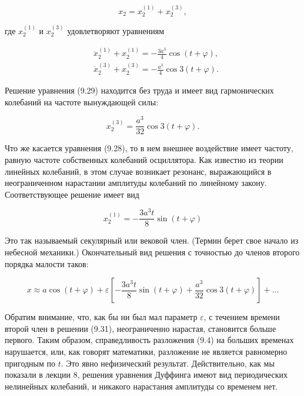 \documentclass[10pt]{article}
\begin{document}
\begin{equation*}
x_{2}=x_{2}^{(1)}+x_{2}^{(3)}, \tag{9.27}
\end{equation*}


где $x_{2}^{(1)}$ и $x_{2}^{(3)}$ удовлетворяют уравнениям


\begin{align*}
& \ddot{x}_{2}^{(1)}+x_{2}^{(1)}=-\frac{3 a^{3}}{4} \cos (t+\varphi),  \tag{9.28}\\
& \ddot{x}_{2}^{(3)}+x_{2}^{(3)}=-\frac{a^{3}}{4} \cos 3(t+\varphi) . \tag{9.29}
\end{align*}


Решение уравнения (9.29) находится без труда и имеет вид гармонических колебаний на частоте вынуждающей силы:


\begin{equation*}
x_{2}^{(3)}=\frac{a^{3}}{32} \cos 3(t+\varphi) . \tag{9.30}
\end{equation*}


Что же касается уравнения (9.28), то в нем внешнее воздействие имеет частоту, равную частоте собственных колебаний осциллятора. Как известно из теории линейных колебаний, в этом случае возникает резонанс, выражающийся в неограниченном нарастании амплитуды колебаний по линейному закону. Соответствующее решение имеет вид


\begin{equation*}
x_{2}^{(1)}=-\frac{3 a^{3} t}{8} \sin (t+\varphi) \tag{9.30}
\end{equation*}


Это так называемый секулярный или вековой член. (Термин берет свое начало из небесной механики.) Окончательный вид решения с точностью до членов второго порядка малости таков:


\begin{equation*}
x \approx a \cos (t+\varphi)+\varepsilon\left[-\frac{3 a^{3} t}{8} \sin (t+\varphi)+\frac{a^{3}}{32} \cos 3(t+\varphi)\right]+\ldots \tag{9.31}
\end{equation*}


Обратим внимание, что, как бы ни был мал параметр $\varepsilon$, с течением времени второй член в решении (9.31), неограниченно нарастая, становится больше первого. Таким образом, справедливость разложения (9.4) на больших временах нарушается, или, как говорят математики, разложение не является равномерно пригодным по $t$. Это явно нефизический результат. Действительно, как мы показали в лекции 8, решения уравнения Дуффинга имеют вид периодических нелинейных колебаний, и никакого нарастания амплитуды со временем нет.
\end{document}
